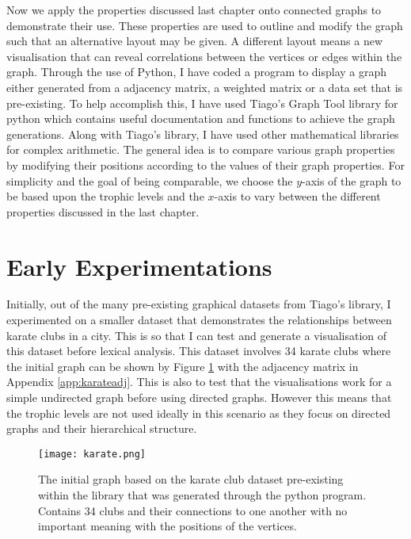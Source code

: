 Now we apply the properties discussed last chapter onto connected graphs to demonstrate their use. These properties are used to outline and modify the graph such that an alternative layout may be given. A different layout means a new visualisation that can reveal correlations between the vertices or edges within the graph. Through the use of Python, I have coded a program to display a graph either generated from a adjacency matrix, a weighted matrix or a data set that is pre-existing. To help accomplish this, I have used Tiago's Graph Tool library for python which contains useful documentation and functions to achieve the graph generations. Along with Tiago's library, I have used other mathematical libraries for complex arithmetic. The general idea is to compare various graph properties by modifying their positions according to the values of their graph properties. For simplicity and the goal of being comparable, we choose the $y$-axis of the graph to be based upon the trophic levels and the $x$-axis to vary between the different properties discussed in the last chapter.

\section{Early Experimentations}
Initially, out of the many pre-existing graphical datasets from Tiago's library, I experimented on a smaller dataset that demonstrates the relationships between karate clubs in a city. This is so that I can test and generate a visualisation of this dataset before lexical analysis. This dataset involves 34 karate clubs where the initial graph can be shown by Figure \ref{fig:karate} with the adjacency matrix in Appendix \ref{app:karateadj}. This is also to test that the visualisations work for a simple undirected graph before using directed graphs. However this means that the trophic levels are not used ideally in this scenario as they focus on directed graphs and their hierarchical structure.

\begin{figure}[!htb]
	\centering
	\texttt{[image: karate.png]}
	\caption{The initial graph based on the karate club dataset pre-existing within the library that was generated through the python program. Contains 34 clubs and their connections to one another with no important meaning with the positions of the vertices.}
	\label{fig:karate}
\end{figure}

